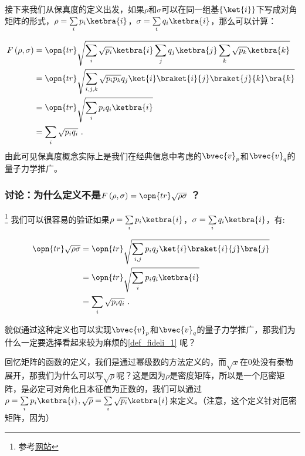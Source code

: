 接下来我们从保真度的定义出发，如果$\rho$和$\sigma$可以在同一组基$\left\{\ket{i}\right\}$下写成对角矩阵的形式，$\rho = \sum\limits_ip_i\ketbra{i}$，$\sigma = \sum\limits_iq_i\ketbra{i}$，那么可以计算：

\begin{equation}
\begin{aligned}
F\left(\rho,\sigma\right) &= \opn{tr}\sqrt{\sum_{i} \sqrt{p_i}\ketbra{i}\sum_{j}q_j\ketbra{j}\sum_k\sqrt{p_k}\ketbra{k}} \\
&= \opn{tr}\sqrt{\sum_{i,j,k}\sqrt{p_ip_k}q_j\ket{i}\braket{i}{j}\braket{j}{k}\bra{k}} \\
&= \opn{tr}\sqrt{\sum_ip_iq_i\ketbra{i}} \\
&= \sum_i\sqrt{p_iq_i}~.
\end{aligned}~
\end{equation}
由此可见保真度概念实际上是我们在经典信息中考虑的$\bvec{v}_p$和$\bvec{v}_q$的量子力学推广。

\subsubsection{讨论：为什么定义不是$F\left(\rho,\sigma\right) = \opn{tr}\sqrt{\rho\sigma}~$？}
\footnote{参考\href{https://physics.stackexchange.com/questions/532223/why-is-the-standard-definition-of-fidelity-unnecessarily-complicated}{网站}}
我们可以很容易的验证如果$\rho = \sum\limits_i p_i\ketbra{i}$，$\sigma = \sum\limits_i q_i \ketbra{i}$，有:

\begin{equation}
\begin{aligned}
\opn{tr}\sqrt{\rho\sigma} &= \opn{tr}\sqrt{\sum_{i,j}p_iq_j\ket{i}\braket{i}{j}\bra{j}} \\
&= \opn{tr}\sqrt{\sum_ip_iq_i\ketbra{i}} \\&=\sum_i\sqrt{p_iq_i}~.
\end{aligned}~
\end{equation}

貌似通过这种定义也可以实现$\bvec{v}_p$和$\bvec{v}_q$的量子力学推广，那我们为什么一定要选择看起来较为麻烦的\autoref{def_fideli_1} 呢？

回忆矩阵的函数的定义，我们是通过幂级数的方法定义的，而$\sqrt{x}$在$0$处没有泰勒展开，那我们为什么可以写$\sqrt{\rho}$呢？这是因为$\rho$是密度矩阵，所以是一个厄密矩阵，是必定可对角化且本征值为正数的，我们可以通过$\rho = \sum\limits_ip_i\ketbra{i},\sqrt{\rho} = \sum\limits_i\sqrt{p_i}\ketbra{i}$来定义。（注意，这个定义针对厄密矩阵，因为）
